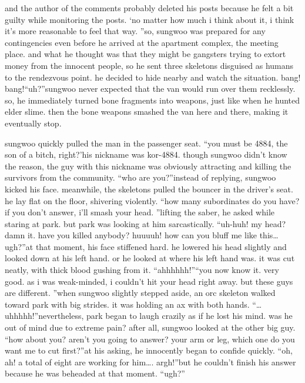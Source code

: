  and the author of the comments probably deleted his posts because he felt a bit guilty while monitoring the posts.
‘no matter how much i think about it, i think it’s more reasonable to feel that way.
”so, sungwoo was prepared for any contingencies even before he arrived at the apartment complex, the meeting place.
 and what he thought was that they might be gangsters trying to extort money from the innocent people, so he sent three skeletons disguised as humans to the rendezvous point.
 he decided to hide nearby and watch the situation.
bang! bang!“uh?”sungwoo never expected that the van would run over them recklessly.
 so, he immediately turned bone fragments into weapons, just like when he hunted elder slime.
then the bone weapons smashed the van here and there, making it eventually stop.


sungwoo quickly pulled the man in the passenger seat.
“you must be 4884, the son of a bitch, right?’his nickname was kor-4884.
 though sungwoo didn’t know the reason, the guy with this nickname was obviously attracting and killing the survivors from the community.
“who are you?”instead of replying, sungwoo kicked his face.
meanwhile, the skeletons pulled the bouncer in the driver’s seat.
 he lay flat on the floor, shivering violently.
“how many subordinates do you have? if you don’t answer, i’ll smash your head.
”lifting the saber, he asked while staring at park.
 but park was looking at him sarcastically.
“uh-huh! my head? damn it.
 have you killed anybody? huuuuh! how can you bluff me like this…ugh?”at that moment, his face stiffened hard.
 he lowered his head slightly and looked down at his left hand.
 or he looked at where his left hand was.
 it was cut neatly, with thick blood gushing from it.
“ahhhhhh!”“you now know it.
 very good.
 as i was weak-minded, i couldn’t hit your head right away.
 but these guys are different.
”when sungwoo slightly stepped aside, an orc skeleton walked toward park with big strides.
it was holding an ax with both hands.
“…uhhhhh!”nevertheless, park began to laugh crazily as if he lost his mind.
 was he out of mind due to extreme pain? after all, sungwoo looked at the other big guy.
“how about you? aren’t you going to answer? your arm or leg, which one do you want me to cut first?”at his asking, he innocently began to confide quickly.
“oh, ah! a total of eight are working for him….
argh!”but he couldn’t finish his answer because he was beheaded at that moment.
“ugh?”

 